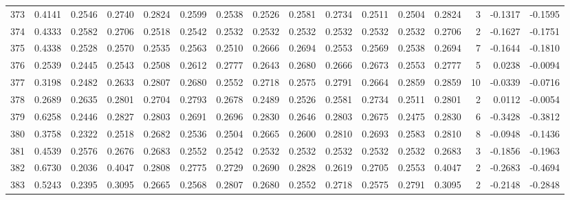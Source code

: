 \begin{tabular}{lrrrrrrrrrrrrrrr}
373 &      0.4141 &  0.2546 &  0.2740 &  0.2824 &  0.2599 &  0.2538 &  0.2526 &  0.2581 &  0.2734 &  0.2511 &   0.2504 &     0.2824 &      3 &                   -0.1317 &                    -0.1595 \\
374 &      0.4333 &  0.2582 &  0.2706 &  0.2518 &  0.2542 &  0.2532 &  0.2532 &  0.2532 &  0.2532 &  0.2532 &   0.2532 &     0.2706 &      2 &                   -0.1627 &                    -0.1751 \\
375 &      0.4338 &  0.2528 &  0.2570 &  0.2535 &  0.2563 &  0.2510 &  0.2666 &  0.2694 &  0.2553 &  0.2569 &   0.2538 &     0.2694 &      7 &                   -0.1644 &                    -0.1810 \\
376 &      0.2539 &  0.2445 &  0.2543 &  0.2508 &  0.2612 &  0.2777 &  0.2643 &  0.2680 &  0.2666 &  0.2673 &   0.2553 &     0.2777 &      5 &                    0.0238 &                    -0.0094 \\
377 &      0.3198 &  0.2482 &  0.2633 &  0.2807 &  0.2680 &  0.2552 &  0.2718 &  0.2575 &  0.2791 &  0.2664 &   0.2859 &     0.2859 &     10 &                   -0.0339 &                    -0.0716 \\
378 &      0.2689 &  0.2635 &  0.2801 &  0.2704 &  0.2793 &  0.2678 &  0.2489 &  0.2526 &  0.2581 &  0.2734 &   0.2511 &     0.2801 &      2 &                    0.0112 &                    -0.0054 \\
379 &      0.6258 &  0.2446 &  0.2827 &  0.2803 &  0.2691 &  0.2696 &  0.2830 &  0.2646 &  0.2803 &  0.2675 &   0.2475 &     0.2830 &      6 &                   -0.3428 &                    -0.3812 \\
380 &      0.3758 &  0.2322 &  0.2518 &  0.2682 &  0.2536 &  0.2504 &  0.2665 &  0.2600 &  0.2810 &  0.2693 &   0.2583 &     0.2810 &      8 &                   -0.0948 &                    -0.1436 \\
381 &      0.4539 &  0.2576 &  0.2676 &  0.2683 &  0.2552 &  0.2542 &  0.2532 &  0.2532 &  0.2532 &  0.2532 &   0.2532 &     0.2683 &      3 &                   -0.1856 &                    -0.1963 \\
382 &      0.6730 &  0.2036 &  0.4047 &  0.2808 &  0.2775 &  0.2729 &  0.2690 &  0.2828 &  0.2619 &  0.2705 &   0.2553 &     0.4047 &      2 &                   -0.2683 &                    -0.4694 \\
383 &      0.5243 &  0.2395 &  0.3095 &  0.2665 &  0.2568 &  0.2807 &  0.2680 &  0.2552 &  0.2718 &  0.2575 &   0.2791 &     0.3095 &      2 &                   -0.2148 &                    -0.2848 \\

\end{tabular}
